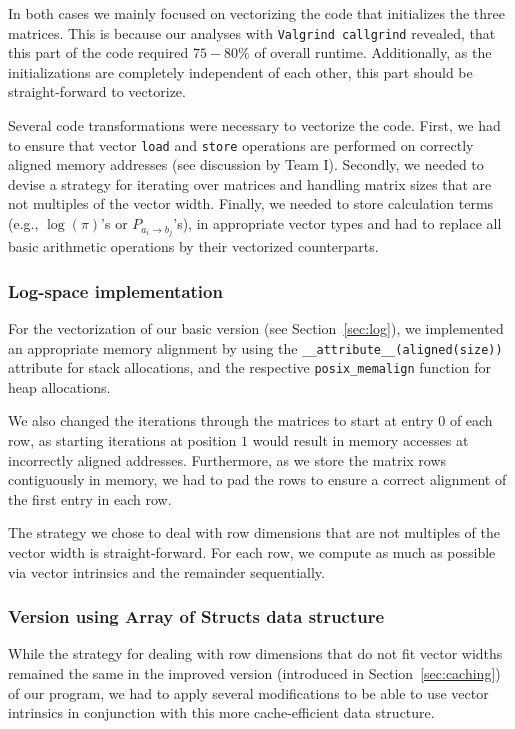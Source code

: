 \documentclass[runningheads,a4paper]{llncs}
\begin{document}
In both cases we mainly focused on vectorizing the code that initializes the three matrices.
This is because our analyses with \texttt{Valgrind callgrind} revealed, that this
part of the code required $75-80\%$ of overall runtime.
Additionally, as the initializations are completely independent of each other, this part should be straight-forward to vectorize.

Several code transformations were necessary to vectorize the code.
First, we had to ensure that vector \texttt{load} and \texttt{store} operations are performed on correctly aligned memory addresses (see discussion by Team I).
Secondly, we needed to devise a strategy for iterating over matrices and handling matrix sizes that are not multiples of the vector width.
Finally, we needed to store calculation terms (e.g., $\log(\pi)$'s or $P_{a_i \to b_j}$'s), in appropriate vector types and
had to replace all basic arithmetic operations by their vectorized counterparts.

\subsubsection{Log-space implementation}
For the vectorization of our basic version (see Section~\ref{sec:log}), we implemented an appropriate memory alignment
by using the \texttt{\_\_attribute\_\_(aligned(\texttt{size}))} attribute for stack allocations,
and the respective \texttt{posix\_memalign} function for heap allocations.

We also changed the iterations through the matrices to start at entry $0$ of each row, as starting iterations at position $1$
would result in memory accesses at incorrectly aligned addresses.
Furthermore, as we store the matrix rows contiguously in memory,
we had to pad the rows to ensure a correct alignment of the first entry in each row.

The strategy we chose to deal with row dimensions that are not multiples of the vector width is straight-forward.
For each row, we compute as much as possible via vector intrinsics and the remainder sequentially.

\subsubsection{Version using Array of Structs data structure}
While the strategy for dealing with row dimensions that do not fit vector widths remained the same in the improved version (introduced in Section~\ref{sec:caching}) of our program,
we had to apply several modifications to be able to use vector intrinsics in conjunction with this more cache-efficient data structure.
\end{document}
